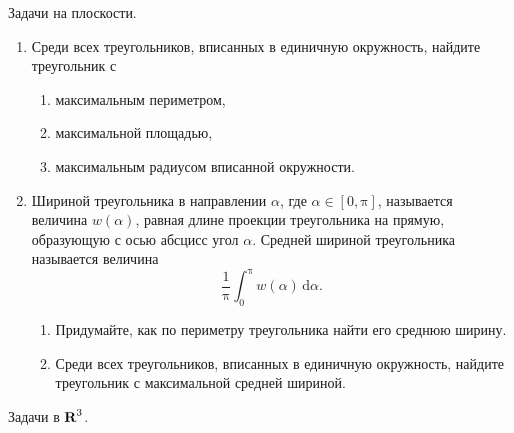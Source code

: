 
\noindent Задачи на плоскости.
\begin{enumerate}
\item Среди всех треугольников, вписанных в единичную окружность, найдите треугольник с
\begin{enumerate}
\item максимальным периметром,
\item максимальной площадью,
\item максимальным радиусом вписанной окружности.
\end{enumerate}
\item Шириной треугольника в направлении $\alpha$, где $\alpha\in[0,\text{π}]$, называется величина $w(\alpha)$, равная длине проекции треугольника на прямую, образующую с осью абсцисс угол $\alpha$. Средней шириной треугольника называется величина
	\[
	\frac{1}{\text{π}}\int_{0}^{\text{π}}w(\alpha)\,\text{d} \alpha.
	\]
\begin{enumerate}
\item Придумайте, как по периметру треугольника найти его среднюю ширину.	
\item Среди всех треугольников, вписанных в единичную окружность, найдите треугольник с максимальной средней шириной.
\end{enumerate}
\end{enumerate}
Задачи в $\text{\bfseries R}^3$.
